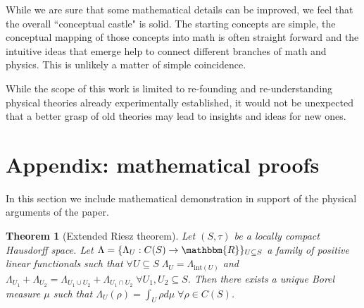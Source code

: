 \documentclass[aps,pra,10pt,twocolumn,floatfix,nofootinbib]{revtex4-1}
\numberwithin{equation}{section}
\newtheorem{thrm}[equation]{Theorem}
\theoremstyle{definition}
\begin{document}
While we are sure that some mathematical details can be improved, we feel that the overall ``conceptual castle" is solid. The starting concepts are simple, the conceptual mapping of those concepts into math is often straight forward and the intuitive ideas that emerge help to connect different branches of math and physics. This is unlikely a matter of simple coincidence.

While the scope of this work is limited to re-founding and re-understanding physical theories already experimentally established, it would not be unexpected that a better grasp of old theories may lead to insights and ideas for new ones.



\section{Appendix: mathematical proofs}

In this section we include mathematical demonstration in support of the physical arguments of the paper.

\begin{thrm}[Extended Riesz theorem]\label{extended_riesz_theorem}
	Let $(S, \tau)$ be a locally compact Hausdorff space. Let $\Lambda = \{\Lambda_U : C(S) \rightarrow \mathbbm{R}\}_{U \subseteq S}$ a family of positive linear functionals such that $\forall U \subseteq S \; \Lambda_U = \Lambda_{\mathrm{int}(U)}$ and $\Lambda_{U_1} + \Lambda_{U_2} = \Lambda_{U_1 \cup U_2} + \Lambda_{U_1 \cap U_2} \; \forall U_1, U_2 \subseteq S$. Then there exists a unique Borel measure $\mu$ such that $\Lambda_U (\rho) = \int_{U} \rho d\mu \; \forall \rho \in C(S)$.
\end{thrm}
\end{document}

